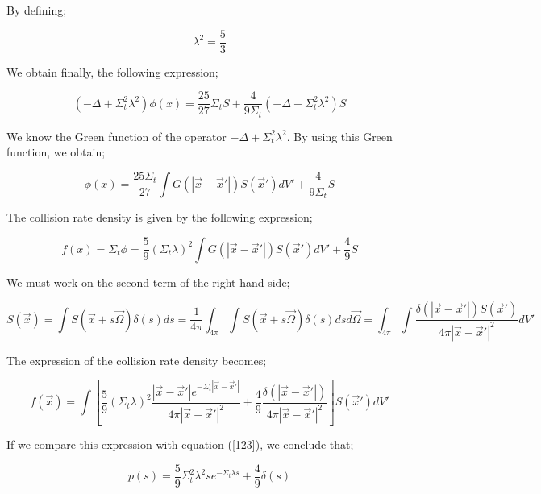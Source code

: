 \documentclass[a4paper, 12pt]{report}
\begin{document}
By defining;

\begin{equation}
\lambda^2 = \frac{5}{3}
\end{equation}

We obtain finally, the following expression;

\begin{equation}
(-\Delta + \Sigma_t^2 \lambda^2)\phi(x) = \frac{25}{27}\Sigma_t S + \frac{4}{9\Sigma_t}(-\Delta + \Sigma_t^2 \lambda^2)S
\end{equation}

We know the Green function of the operator $-\Delta + \Sigma_t^2 \lambda^2$. By using this Green function, we obtain;

\begin{equation}
\phi(x) = \frac{25\Sigma_t}{27} \int G(|\vec{x}-\vec{x}'|) S(\vec{x}') dV' + \frac{4}{9\Sigma_t}S
\end{equation}

The collision rate density is given by the following expression;

\begin{equation}
f(x) = \Sigma_t \phi = \frac{5}{9}(\Sigma_t \lambda)^2 \int G(|\vec{x}-\vec{x}'|) S(\vec{x}') dV' +  \frac{4}{9}S 
\end{equation}

We must work on the second term of the right-hand side;

\begin{equation}
S(\vec{x}) = \int S(\vec{x}+s\vec{\Omega}) \delta(s) ds = \frac{1}{4\pi} \int_{4\pi} \int S(\vec{x}+s\vec{\Omega})\delta(s) dsd\vec{\Omega} = \int_{4\pi} \int \frac{\delta(|\vec{x}-\vec{x}'|)S(\vec{x}')}{4\pi |\vec{x}-\vec{x}'|^2}dV'
\end{equation}

The expression of the collision rate density becomes;

\begin{equation}
f(\vec{x}) = \int \left[\frac{5}{9}(\Sigma_t \lambda)^2 \frac{|\vec{x}-\vec{x}'| e^{-\Sigma_t|\vec{x}-\vec{x}'|}}{4\pi|\vec{x}-\vec{x}'|^2} + \frac{4}{9} \frac{\delta(|\vec{x}-\vec{x}'|)}{4\pi |\vec{x}-\vec{x}'|^2}\right]S(\vec{x}')dV'
\end{equation}

If we compare this expression with equation (\ref{123}), we conclude that;

\begin{equation}
p(s) =\frac{5}{9} \Sigma_t^2 \lambda^2 s e^{-\Sigma_t \lambda s} + \frac{4}{9} \delta(s)
\end{equation}
\end{document}
